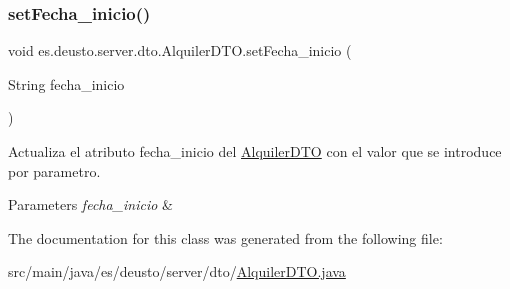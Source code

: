 \subsubsection{\texorpdfstring{setFecha\_inicio()}{setFecha\_inicio()}}
{\footnotesize\ttfamily void es.\+deusto.\+server.\+dto.\+Alquiler\+D\+T\+O.\+set\+Fecha\+\_\+inicio (\begin{DoxyParamCaption}\item[{String}]{fecha\+\_\+inicio }\end{DoxyParamCaption})}

Actualiza el atributo fecha\+\_\+inicio del \mbox{\hyperlink{classes_1_1deusto_1_1server_1_1dto_1_1_alquiler_d_t_o}{Alquiler\+D\+TO}} con el valor que se introduce por parametro. 
\begin{DoxyParams}{Parameters}
{\em fecha\+\_\+inicio} & \\
\hline
\end{DoxyParams}


The documentation for this class was generated from the following file\+:\begin{DoxyCompactItemize}
\item 
src/main/java/es/deusto/server/dto/\mbox{\hyperlink{_alquiler_d_t_o_8java}{Alquiler\+D\+T\+O.\+java}}\end{DoxyCompactItemize}
